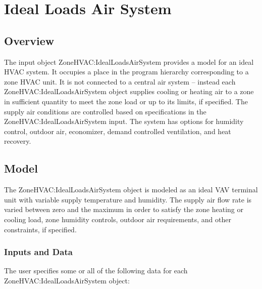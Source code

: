 \section{Ideal Loads Air System }\label{ideal-loads-air-system}

\subsection{Overview}\label{overview-021}

The input object ZoneHVAC:IdealLoadsAirSystem provides a model for an ideal HVAC system. It occupies a place in the program hierarchy corresponding to a zone HVAC unit. It is not connected to a central air system -- instead each ZoneHVAC:IdealLoadsAirSystem object supplies cooling or heating air to a zone in sufficient quantity to meet the zone load or up to its limits, if specified. The supply air conditions are controlled based on specifications in the ZoneHVAC:IdealLoadsAirSystem input. The system has options for humidity control, outdoor air, economizer, demand controlled ventilation, and heat recovery.

\subsection{Model}\label{model-002}

The ZoneHVAC:IdealLoadsAirSystem object is modeled as an ideal VAV terminal unit with variable supply temperature and humidity. The supply air flow rate is varied between zero and the maximum in order to satisfy the zone heating or cooling load, zone humidity controls, outdoor air requirements, and other constraints, if specified.

\subsubsection{Inputs and Data}\label{inputs-and-data-002}

The user specifies some or all of the following data for each ZoneHVAC:IdealLoadsAirSystem object:

